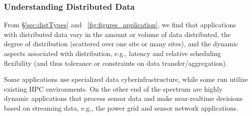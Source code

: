 






\subsubsection{Understanding Distributed Data}

From \S\ref{sec:distTypes} and \figurename~\ref{fig:figures_application}, we
find that applications with distributed data vary in the amount or volume of
data distributed, the degree of distribution (scattered over one site or many
sites), and the dynamic aspects associated with distribution, e.g., latency and
relative scheduling flexibility (and thus tolerance or constraints on data
transfer/aggregation).

Some applications use specialized data cyberinfrastructure, while some run
utilize existing HPC environments.  On the other end of the spectrum are highly
dynamic applications that process sensor data and make near-realtime decisions
based on streaming data, e.g., the power grid and sensor network applications.


